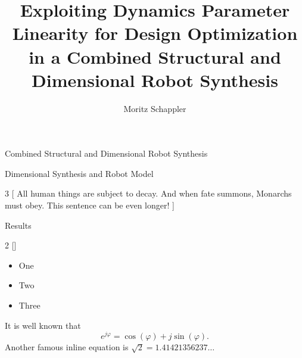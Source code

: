 \documentclass[c]{beamer}
\author[moritz.schappler@imes.uni-hannover.de]{Moritz Schappler}
\title{Exploiting Dynamics Parameter Linearity for Design Optimization in a Combined Structural and Dimensional Robot Synthesis}
\institute{Institute of Mechatronic Systems}
\newcommand{\postersubsection}[1]{%
\setlength\fboxsep{0pt}%
\vfil\penalty125\vfilneg\vskip1.5ex
\colorbox{Grau}{\parbox[b]{\columnwidth}{\vskip0.75ex%
\Large\hskip1ex #1%
\vskip0.75ex}}%
}
\begin{document}
\begin{frame}
\begin{block}{Combined Structural and Dimensional Robot Synthesis}
\parbox{\linewidth}{
}
\end{block}
\begin{whiteblock}{Dimensional Synthesis and Robot Model}
\parbox{\linewidth}{
\begin{multicols}{3}
[
All human things are subject to decay. And when fate summons, Monarchs must obey. This sentence can be even longer!
]
\blindtext[1]
\blindtext[1]
\end{multicols}}
\end{whiteblock}
\begin{block}{Results}
\parbox{\columnwidth}{
\begin{multicols}{2}
[]
\begin{itemize}
    \item One
    \item Two
    \item Three
\end{itemize}

It is well known that
\begin{equation}
e^{j \varphi} = \cos(\varphi) + j \sin(\varphi).
\end{equation}
Another famous inline equation is $ \sqrt{2} = 1.41421356237\!\ldots $


\end{multicols}}
\end{block}
\end{frame}
\end{document}
